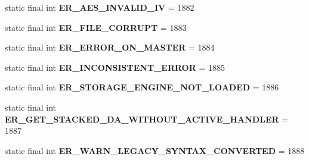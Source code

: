 \begin{DoxyCompactItemize}
\mbox{\label{classcom_1_1mysql_1_1jdbc_1_1_mysql_error_numbers_acdb0398387adc66f39ed78bd7c2e33f0}} 
static final int {\bfseries E\+R\+\_\+\+A\+E\+S\+\_\+\+I\+N\+V\+A\+L\+I\+D\+\_\+\+IV} = 1882
\item 
\mbox{\label{classcom_1_1mysql_1_1jdbc_1_1_mysql_error_numbers_a0e15f1420085b6aa2a774c939a9f719d}} 
static final int {\bfseries E\+R\+\_\+\+F\+I\+L\+E\+\_\+\+C\+O\+R\+R\+U\+PT} = 1883
\item 
\mbox{\label{classcom_1_1mysql_1_1jdbc_1_1_mysql_error_numbers_a2f27d74fed77796bec809bd6cf041da3}} 
static final int {\bfseries E\+R\+\_\+\+E\+R\+R\+O\+R\+\_\+\+O\+N\+\_\+\+M\+A\+S\+T\+ER} = 1884
\item 
\mbox{\label{classcom_1_1mysql_1_1jdbc_1_1_mysql_error_numbers_a442ef3ce55a3d61c77620735363ba6eb}} 
static final int {\bfseries E\+R\+\_\+\+I\+N\+C\+O\+N\+S\+I\+S\+T\+E\+N\+T\+\_\+\+E\+R\+R\+OR} = 1885
\item 
\mbox{\label{classcom_1_1mysql_1_1jdbc_1_1_mysql_error_numbers_ae4a7f0010fe8d53d2d6b112bfa68dd78}} 
static final int {\bfseries E\+R\+\_\+\+S\+T\+O\+R\+A\+G\+E\+\_\+\+E\+N\+G\+I\+N\+E\+\_\+\+N\+O\+T\+\_\+\+L\+O\+A\+D\+ED} = 1886
\item 
\mbox{\label{classcom_1_1mysql_1_1jdbc_1_1_mysql_error_numbers_ae8a94d90e1d8eddf6b34e6762635d5ce}} 
static final int {\bfseries E\+R\+\_\+\+G\+E\+T\+\_\+\+S\+T\+A\+C\+K\+E\+D\+\_\+\+D\+A\+\_\+\+W\+I\+T\+H\+O\+U\+T\+\_\+\+A\+C\+T\+I\+V\+E\+\_\+\+H\+A\+N\+D\+L\+ER} = 1887
\item 
\mbox{\label{classcom_1_1mysql_1_1jdbc_1_1_mysql_error_numbers_aa3aa21c906e7709bc4213b443ad7fe1e}} 
static final int {\bfseries E\+R\+\_\+\+W\+A\+R\+N\+\_\+\+L\+E\+G\+A\+C\+Y\+\_\+\+S\+Y\+N\+T\+A\+X\+\_\+\+C\+O\+N\+V\+E\+R\+T\+ED} = 1888
\item 
\mbox{\label{classcom_1_1mysql_1_1jdbc_1_1_mysql_error_numbers_ad576bd88919a9da9ed751cdf8e028da6}} 

\end{DoxyCompactItemize}
